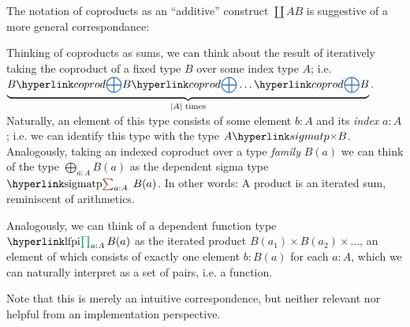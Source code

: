 \begin{remark}
	The notation of coproducts as an ``additive'' construct $\coprod AB$ is suggestive of a more general correspondance:
	
	Thinking of coproducts as sums, we can think about the result of iteratively taking the coproduct of a fixed type $B$ over some index type $A$; i.e. $\underbrace{B\coprodsym B\coprodsym\ldots \coprodsym B}_{\mid A\mid\text{ times}}$. Naturally, an element of this type consists of some element $b:A$ and its \emph{index} $a:A$; i.e. we can identify this type with the type $\simpleprod AB$. Analogously, taking an indexed coproduct over a type \emph{family} $B(a)$ we can think of the type $\bigoplus_{a:A} B(a)$ as the dependent sigma type $\sigmatp{a:A}{B(a)}$. In other words: A product is an iterated sum, reminiscent of arithmetics.
	
	Analogously, we can think of a dependent function type $\lfpi{a:A}{B(a)}$ as the iterated product $B(a_1)\times B(a_2) \times\ldots$, an element of which consists of exactly one element $b:B(a)$ for each $a:A$, which we can naturally interpret as a set of pairs, i.e. a function.
	
	Note that this is merely an intuitive correspondence, but neither relevant nor helpful from an implementation perspective.
\end{remark}